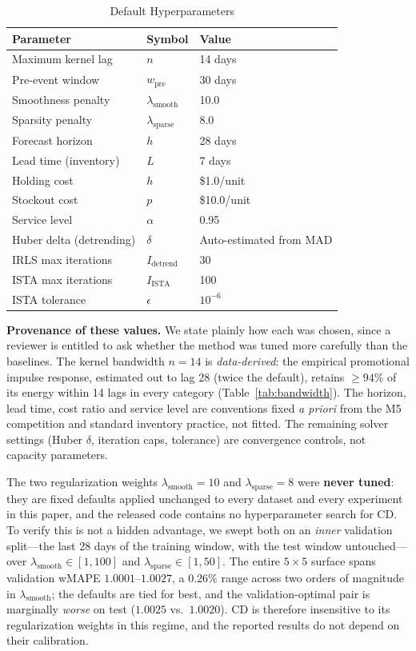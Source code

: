 \documentclass[10pt]{article} %
\theoremstyle{plain}
\theoremstyle{definition}
\begin{document}
\begin{table}[ht]
\centering
\small
\caption{Default Hyperparameters}
\label{tab:hyperparams}
\begin{tabular}{lll}
\toprule
Parameter & Symbol & Value \\
\midrule
Maximum kernel lag & $n$ & 14 days \\
Pre-event window & $w_{\text{pre}}$ & 30 days \\
Smoothness penalty & $\lambda_{\text{smooth}}$ & 10.0 \\
Sparsity penalty & $\lambda_{\text{sparse}}$ & 8.0 \\
Forecast horizon & $h$ & 28 days \\
Lead time (inventory) & $L$ & 7 days \\
Holding cost & $h$ & \$1.0/unit \\
Stockout cost & $p$ & \$10.0/unit \\
Service level & $\alpha$ & 0.95 \\
Huber delta (detrending) & $\delta$ & Auto-estimated from MAD \\
IRLS max iterations & $I_{\text{detrend}}$ & 30 \\
ISTA max iterations & $I_{\text{ISTA}}$ & 100 \\
ISTA tolerance & $\epsilon$ & $10^{-6}$ \\
\bottomrule
\end{tabular}
\end{table}


\textbf{Provenance of these values.} We state plainly how each was chosen, since a reviewer is
entitled to ask whether the method was tuned more carefully than the baselines.
The kernel bandwidth $n=14$ is \emph{data-derived}: the empirical promotional impulse response,
estimated out to lag 28 (twice the default), retains $\geq 94\%$ of its energy within 14 lags in
every category (Table~\ref{tab:bandwidth}). The horizon, lead time, cost ratio and service level
are conventions fixed \emph{a priori} from the M5 competition and standard inventory practice,
not fitted. The remaining solver settings (Huber $\delta$, iteration caps, tolerance) are
convergence controls, not capacity parameters.

The two regularization weights $\lambda_{\text{smooth}}=10$ and $\lambda_{\text{sparse}}=8$ were
\textbf{never tuned}: they are fixed defaults applied unchanged to every dataset and every
experiment in this paper, and the released code contains no hyperparameter search for CD. To
verify this is not a hidden advantage, we swept both on an \emph{inner} validation split---the
last 28 days of the training window, with the test window untouched---over
$\lambda_{\text{smooth}} \in [1,100]$ and $\lambda_{\text{sparse}} \in [1,50]$. The entire
$5\times5$ surface spans validation wMAPE $1.0001$--$1.0027$, a $0.26\%$ range across two orders
of magnitude in $\lambda_{\text{smooth}}$; the defaults are tied for best, and the
validation-optimal pair is marginally \emph{worse} on test ($1.0025$ vs.\ $1.0020$). CD is
therefore insensitive to its regularization weights in this regime, and the reported results do
not depend on their calibration.
\end{document}
